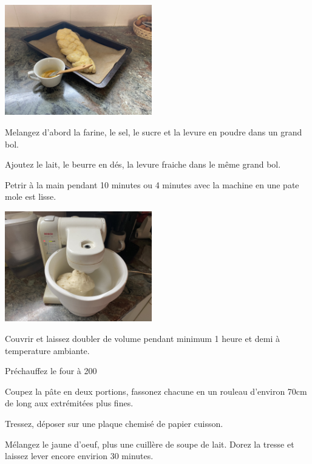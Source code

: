 \documentclass[10pt,a4paper]{report}
\begin{document}
\begin{multicols}{2}
        \centerline{\includegraphics[width=0.48\textwidth]{./assets/tresse_du_dimanche_4}}
        \columnbreak

        Melangez d'abord la farine, le sel, le sucre et la levure en poudre dans un grand bol.
        \newline

        Ajoutez le lait, le beurre en dés, la levure fraiche dans le même grand bol.
        \newline

        Petrir à la main pendant 10 minutes ou 4 minutes avec la machine en une pate mole est lisse.
        \centerline{\includegraphics[width=0.48\textwidth]{./assets/tresse_du_dimanche}}
        \newline

        Couvrir et laissez doubler de volume pendant minimum 1 heure et demi à temperature ambiante.
        \newline

        Préchauffez le four à 200\textdegree
        \newline

        Coupez la pâte en deux portions, fassonez chacune en un rouleau d'environ 70cm de long aux extrémitées plus fines.
        \newline

        Tressez, déposer sur une plaque chemisé de papier cuisson.
        \newline

        Mélangez le jaune d'oeuf, plus une cuillère de soupe de lait. Dorez la tresse et laissez lever encore envirion 30 minutes.
        \newline


\end{multicols}
\end{document}
